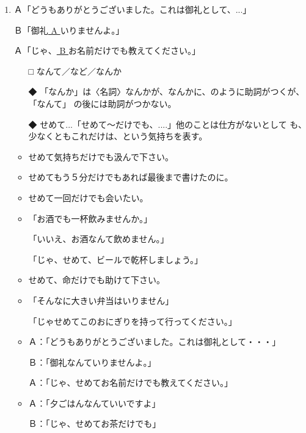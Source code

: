 \documentclass[
uplatex,
b5paper,
10pt,
dvipdfmx
]{jsbook}
\begin{document}
\begin{enumerate}
\item Ａ「どうもありがとうございました。これは御礼として、...」

      Ｂ「御礼\underline{ A }いりませんよ。」

      Ａ「じゃ、\underline{ B   }お名前だけでも教えてください。」
 
\begin{itemize}
\item[□] なんて／など／なんか
\item[◆] 「なんか」は〈名詞〉なんかが、なんかに、のように助詞がつくが、
	  「なんて」 の後には助詞がつかない。
\item[◆] せめて...「せめて〜だけでも、....」他のことは仕方がないとして
	  も、少なくともこれだけは、という気持ちを表す。
\end{itemize}
\begin{itemize}
\item せめて気持ちだけでも汲んで下さい。
\item せめてもう５分だけでもあれば最後まで書けたのに。
\item せめて一回だけでも会いたい。
\item 「お酒でも一杯飲みませんか。」

      「いいえ、お酒なんて飲めません。」

      「じゃ、せめて、ビールで乾杯しましょう。」

\item せめて、命だけでも助けて下さい。
\item 「そんなに大きい弁当はいりません」

      「じゃせめてこのおにぎりを持って行ってください。」

\item Ａ：「どうもありがとうございました。これは御礼として・・・」

      Ｂ：「御礼なんていりませんよ。」

      Ａ：「じゃ、せめてお名前だけでも教えてください。」

\item Ａ：「夕ごはんなんていいですよ」

      Ｂ：「じゃ、せめてお茶だけでも」
\end{itemize}


\end{enumerate}
\end{document}
